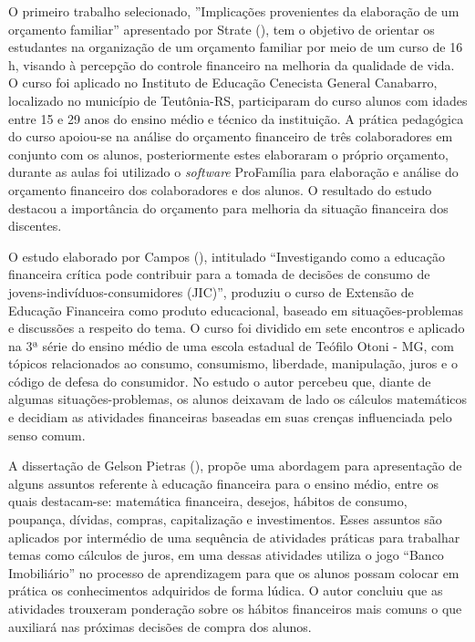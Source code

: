 \newpage
O primeiro trabalho selecionado, ”Implicações provenientes da elaboração de um orçamento familiar” apresentado por Strate (\citeyear{strate2010}), tem o objetivo de orientar os estudantes na organização de um orçamento familiar por meio de um curso de 16 h, visando à percepção do controle financeiro na melhoria da qualidade de vida. O curso foi aplicado no Instituto de Educação Cenecista General Canabarro, localizado no município de Teutônia-RS, participaram do curso alunos com idades entre 15 e 29 anos do ensino médio e técnico da instituição. A prática pedagógica do curso apoiou-se na análise do orçamento financeiro de três colaboradores em conjunto com os alunos, posteriormente estes elaboraram o próprio orçamento, durante as aulas foi utilizado o \textit{software} ProFamília para elaboração e análise do orçamento financeiro dos colaboradores e dos alunos. O resultado do estudo destacou a importância do orçamento para melhoria da situação financeira dos discentes.

O estudo elaborado por Campos (\citeyear{campos2013}), intitulado “Investigando como a educação financeira crítica pode contribuir para a tomada de decisões de consumo de jovens-indivíduos-consumidores (JIC)”, produziu o curso de Extensão de Educação Financeira como produto educacional, baseado em situações-problemas e discussões a respeito do tema. O curso foi dividido em sete encontros e aplicado na 3ª série do ensino médio de uma escola estadual de Teófilo Otoni - MG, com tópicos relacionados ao consumo, consumismo, liberdade, manipulação, juros e o código de defesa do consumidor. No estudo o autor percebeu que, diante de algumas situações-problemas, os alunos deixavam de lado os cálculos matemáticos e decidiam as atividades financeiras baseadas em suas crenças influenciada pelo senso comum.

A dissertação de Gelson Pietras (\citeyear{pietras2014}), propõe uma abordagem para apresentação de alguns assuntos referente à educação financeira para o ensino médio, entre os quais destacam-se: matemática financeira, desejos, hábitos de consumo, poupança, dívidas, compras, capitalização e investimentos. Esses assuntos são aplicados por intermédio de uma sequência de atividades práticas para trabalhar temas como cálculos de juros, em uma dessas atividades utiliza o jogo “Banco Imobiliário” no processo de aprendizagem para que os alunos possam colocar em prática os conhecimentos adquiridos de forma lúdica. O autor concluiu que as atividades trouxeram ponderação sobre os hábitos financeiros mais comuns o que auxiliará nas próximas decisões de compra dos alunos.

